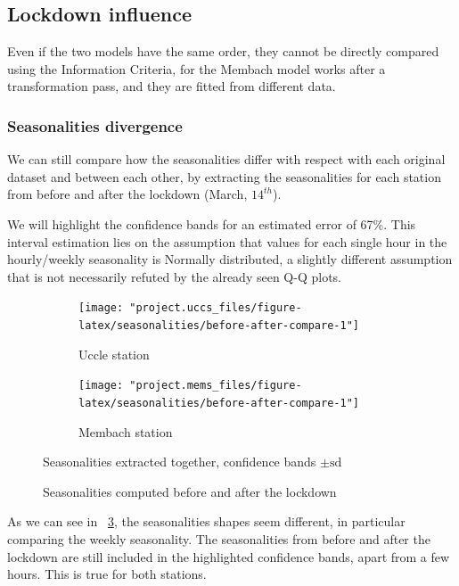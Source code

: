 \documentclass[12pt]{article}
\begin{document}
\subsection{Lockdown influence}
Even if the two models have the same order, they cannot be directly compared using the Information Criteria, for the Membach model works after a transformation pass, and they are fitted from different data.

\subsubsection{Seasonalities divergence}
We can still compare how the seasonalities differ with respect with each original dataset and between each other, by extracting the seasonalities for each station from before and after the lockdown (March, $14^{th}$).

We will highlight the confidence bands for an estimated error of 67\%. This interval estimation lies on the assumption that values for each single hour in the hourly/weekly seasonality is Normally distributed, a slightly different assumption that is not necessarily refuted by the already seen Q-Q plots.

\begin{figure}[h]
	\begin{subfigure}{.5\linewidth}
		\texttt{[image: "project.uccs\_files/figure-latex/seasonalities/before-after-compare-1"]}
		\caption{Uccle station}
		\label{fig:season.lockdown:uccs}
	\end{subfigure}
	\begin{subfigure}{.5\linewidth}
		\texttt{[image: "project.mems\_files/figure-latex/seasonalities/before-after-compare-1"]}
		\caption{Membach station}
		\label{fig:season.lockdown:mems}
	\end{subfigure}
	\begin{center}
		\caption{Seasonalities computed before and after the lockdown}{\small Seasonalities extracted together, confidence bands $\pm\mathrm{sd}$}
		\label{fig:season.lockdown}
	\end{center}
\end{figure}


As we can see in \figurename~\ref{fig:season.lockdown}, the seasonalities shapes seem different, in particular comparing the weekly seasonality. The seasonalities from before and after the lockdown are still included in the highlighted confidence bands, apart from a few hours. This is true for both stations.
\end{document}
